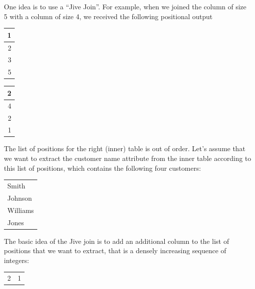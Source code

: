 \documentclass[11pt]{article}
\begin{document}
\begin{enumerate}
\begin{enumerate}
One idea is to use a ``Jive Join''. For example, when we joined the column of size 5 with a column of
size 4, we received the following positional output
\begin{center}
\begin{tabular}{r}
\hline
1\\[0pt]
\hline
2\\[0pt]
\hline
3\\[0pt]
\hline
5\\[0pt]
\hline
\end{tabular}
\end{center}

\begin{center}
\begin{tabular}{r}
\hline
2\\[0pt]
\hline
4\\[0pt]
\hline
2\\[0pt]
\hline
1\\[0pt]
\hline
\end{tabular}
\end{center}

The list of positions for the right (inner) table is out of order. Let’s assume that we want to
extract the customer name attribute from the inner table according to this list of positions, which
contains the following four customers:
\begin{center}
\begin{tabular}{l}
Smith\\[0pt]
Johnson\\[0pt]
Williams\\[0pt]
Jones\\[0pt]
\end{tabular}
\end{center}

The basic idea of the Jive join is to add an additional column to the list of positions that we want
to extract, that is a densely increasing sequence of integers:
\begin{center}
\begin{tabular}{rr}
\hline
2 & 1\\[0pt]
\end{tabular}
\end{center}
\end{enumerate}
\end{enumerate}
\end{document}
